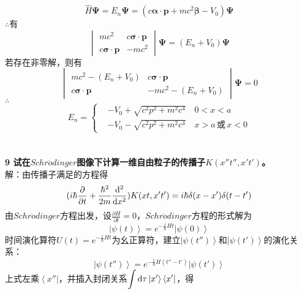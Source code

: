 \documentclass[12pt]{article}
\numberwithin{equation}{section}	 %
\begin{document}
\begin{spacing}{1.5}
\begin{equation}
\hat{H}\bm\Psi=E_{n}\bm\Psi=(c \bm\alpha \cdot \bm{p} + mc^{2}\bm\beta-V_{0})\bm\Psi
\end{equation}		
$\therefore$有
\begin{equation}
\begin{vmatrix}
mc^{2} & c\bm\sigma\cdot\bm{p} \\ c\bm\sigma\cdot\bm{p} & -mc^{2}
\end{vmatrix} \bm\Psi = (E_{n}+V_{0})\bm\Psi
\end{equation}
若存在非零解，则有
\begin{equation}
\begin{vmatrix}
mc^{2}-(E_{n}+V_{0}) & c\bm\sigma\cdot\bm{p} \\ c\bm\sigma\cdot\bm{p} & -mc^{2}-(E_{n}+V_{0})
\end{vmatrix} \bm\Psi = 0
\end{equation}
$\therefore$
\begin{equation}
E_{n}=\left\{ 
\begin{aligned} 	%
&-V_{0}+\sqrt{c^{2}p^{2}+m^{2}c^{4}} \quad 0<x<a \\ 
&-V_{0}-\sqrt{c^{2}p^{2}+m^{2}c^{4}} \quad x>a\,\text{或}\,x<0
\end{aligned} \right. 
\end{equation}
~\\
~\\
\textbf{9 \quad 试在$Schr\ddot{o}dinger$图像下计算一维自由粒子的传播子$K(x''t'',x't')$。}\\
解：由传播子满足的方程得
\begin{equation}
(i\hbar\frac{\partial}{\partial t}+\frac{\hbar^{2}}{2m}\frac{\mathop{}\!\mathrm{d}^{2}}{\mathop{}\!\mathrm{d} x^{2}})K(xt,x't')=i\hbar\delta(x-x')\delta(t-t')
\end{equation}
由$Schr\ddot{o}dinger$方程出发，设$\displaystyle \frac{\partial H}{\partial t}=0$，$Schr\ddot{o}dinger$方程的形式解为
\begin{equation}\nonumber 		%
\left|\psi(t)\right> = e^{-\frac{i}{\hbar}Ht}\left|\psi(0)\right>
\end{equation}
时间演化算符$U(t)=e^{-\frac{i}{\hbar}Ht}$为幺正算符，建立$\left|\psi(t'')\right>$和$\left|\psi(t')\right>$的演化关系：
\begin{equation}\nonumber 		%
\left|\psi(t'')\right> = e^{-\frac{i}{\hbar}H(t''-t')}\left|\psi(t')\right>
\end{equation}
上式左乘$\displaystyle \left<x''\right|$，并插入封闭关系$\displaystyle \int\mathop{}\!\mathrm{d}\tau\left|x'\right>\left<x'\right|$，得

\end{spacing}
\end{document}

